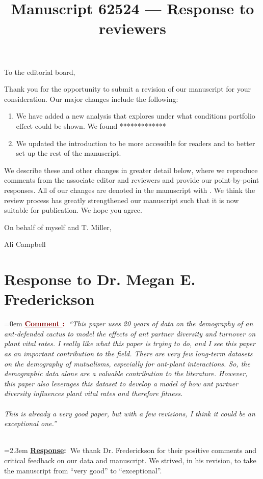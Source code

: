 \documentclass[12pt]{article}
\newcounter{cN}
\newcommand{\comment}[1]{
	\vspace{2em}
	\refstepcounter{cN} %
	\noindent \hangindent=0em \textbf{\textcolor{Maroon}{\uline{Comment \thecN}:~}}\emph{``#1''}
	}
\newcommand{\response}[1]{
	\\[0.25em]
	\hangindent=2.3em \textbf{\textcolor{NavyBlue}{\uline{Response}:~}}#1
	}
\newcommand{\revise}[1]{{\color{Mahogany}{#1}}}
\begin{document}
\title{Manuscript 62524 --- Response to reviewers}

\maketitle
\noindent To the editorial board,

Thank you for the opportunity to submit a revision of our manuscript for your consideration. Our major changes include the following:
\begin{enumerate}
	\item We have added a new analysis that explores under what conditions portfolio effect could be shown. 
	We found *************
	\item We updated the introduction to be more accessible for readers and to better set up the rest of the manuscript.
\end{enumerate}

We describe these and other changes in greater detail below, where we reproduce comments from the associate editor and reviewers and provide our point-by-point responses. 
All of our changes are denoted in the manuscript with \revise{Mahogany font}.
We think the review process has greatly strengthened our manuscript such that it is now suitable for publication.
We hope you agree. 

\vspace{2em}
\hfill On behalf of myself and T. Miller,

\hfill Ali Campbell
\newpage


\section{Response to Dr. Megan E. Frederickson}
\vspace{-2em}

\comment{This paper uses 20 years of data on the demography of an ant-defended cactus to model the effects of ant partner diversity and turnover on plant vital rates. I really like what this paper is trying to do, and I see this paper as an important contribution to the field. There are very few long-term datasets on the demography of mutualisms, especially for ant-plant interactions. So, the demographic data alone are a valuable contribution to the literature. However, this paper also leverages this dataset to develop a model of how ant partner diversity influences plant vital rates and therefore fitness.
\\
\\	
This is already a very good paper, but with a few revisions, I think it could be an exceptional one.}
\response{We thank Dr. Frederickson for their positive comments and critical feedback on our data and manuscript. We strived, in his revision, to take the manuscript from ``very good'' to ``exceptional''.}
\end{document}
